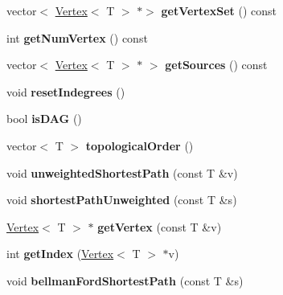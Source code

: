 \begin{DoxyCompactItemize}
\item 
\hypertarget{class_graph_a135e8f915af85904abca9eafaa4f13ce}{}\label{class_graph_a135e8f915af85904abca9eafaa4f13ce} 
vector$<$ \hyperlink{class_vertex}{Vertex}$<$ T $>$ $\ast$$>$ {\bfseries get\+Vertex\+Set} () const
\item 
\hypertarget{class_graph_a0853eac15cdf0f06d63f4b8a7820ec71}{}\label{class_graph_a0853eac15cdf0f06d63f4b8a7820ec71} 
int {\bfseries get\+Num\+Vertex} () const
\item 
\hypertarget{class_graph_a947115150a94f88ac9aedbcec59dd07e}{}\label{class_graph_a947115150a94f88ac9aedbcec59dd07e} 
vector$<$ \hyperlink{class_vertex}{Vertex}$<$ T $>$ $\ast$ $>$ {\bfseries get\+Sources} () const
\item 
\hypertarget{class_graph_af34eb86d804272e6e3e221a9ed688c53}{}\label{class_graph_af34eb86d804272e6e3e221a9ed688c53} 
void {\bfseries reset\+Indegrees} ()
\item 
\hypertarget{class_graph_ab49d07c2bd6b8b30d5ae82bc558b821a}{}\label{class_graph_ab49d07c2bd6b8b30d5ae82bc558b821a} 
bool {\bfseries is\+D\+AG} ()
\item 
\hypertarget{class_graph_a2e75512c089c3916dda9cf61e1185d9d}{}\label{class_graph_a2e75512c089c3916dda9cf61e1185d9d} 
vector$<$ T $>$ {\bfseries topological\+Order} ()
\item 
\hypertarget{class_graph_ae5264597aacaf4f45819e96a6d6c89aa}{}\label{class_graph_ae5264597aacaf4f45819e96a6d6c89aa} 
void {\bfseries unweighted\+Shortest\+Path} (const T \&v)
\item 
\hypertarget{class_graph_aa9e40a7c4afa2c3e5d82141b7ae63864}{}\label{class_graph_aa9e40a7c4afa2c3e5d82141b7ae63864} 
void {\bfseries shortest\+Path\+Unweighted} (const T \&s)
\item 
\hypertarget{class_graph_a350c6cb612ae88c862fc344ff9c39eae}{}\label{class_graph_a350c6cb612ae88c862fc344ff9c39eae} 
\hyperlink{class_vertex}{Vertex}$<$ T $>$ $\ast$ {\bfseries get\+Vertex} (const T \&v)
\item 
\hypertarget{class_graph_a0cc06d704d009dcf46d2305c4ecfb12b}{}\label{class_graph_a0cc06d704d009dcf46d2305c4ecfb12b} 
int {\bfseries get\+Index} (\hyperlink{class_vertex}{Vertex}$<$ T $>$ $\ast$v)
\item 
\hypertarget{class_graph_a1d6769b79beaa76f78fd9c9209833bef}{}\label{class_graph_a1d6769b79beaa76f78fd9c9209833bef} 
void {\bfseries bellman\+Ford\+Shortest\+Path} (const T \&s)
\item 
\hypertarget{class_graph_a445a38cf4045797198eae2b818b602de}{}\label{class_graph_a445a38cf4045797198eae2b818b602de} 
$$
\end{DoxyCompactItemize}
